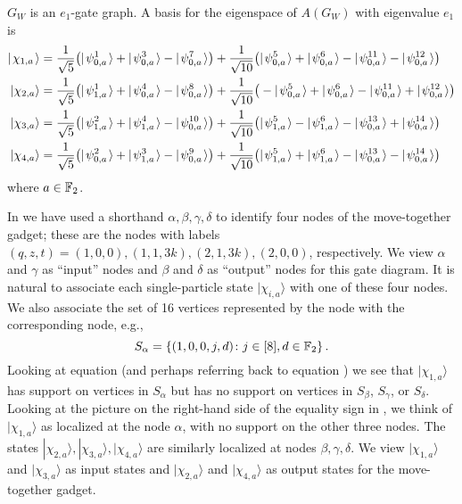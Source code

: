 \documentclass[../thesis-main/thesis-main]{subfiles}
\begin{document}
\begin{lemma}
$G_{W}$ is an $e_{1}$-gate graph. A basis for the eigenspace
of $A(G_{W})$ with eigenvalue $e_1$ is 
\begin{align}
  |\mspace{2mu} \chi_{1,a} \mspace{2mu} \rangle & =\frac{1}{\sqrt{5}}\big(|\mspace{2mu} \psi_{0,a}^{1} \mspace{2mu} \rangle + |\mspace{2mu} \psi_{0,a}^3 \mspace{2mu} \rangle - |\mspace{2mu} \psi_{0,a}^7 \mspace{2mu} \rangle\big) 
    +\frac{1}{\sqrt{10}}\big(|\mspace{2mu} \psi_{0,a}^{5} \mspace{2mu} \rangle + |\mspace{2mu} \psi_{0,a}^6 \mspace{2mu} \rangle - |\mspace{2mu} \psi_{0,a}^{11} \mspace{2mu} \rangle - |\mspace{2mu} \psi_{0,a}^{12} \mspace{2mu} \rangle\big)\label{eq:chi_alpha}\\
  |\chi_{2,a}\rangle & =\frac{1}{\sqrt{5}}\big(|\mspace{2mu} \psi_{1,a}^{1} \mspace{2mu} \rangle + |\mspace{2mu} \psi_{0,a}^4 \mspace{2mu} \rangle - |\mspace{2mu} \psi_{0,a}^8 \mspace{2mu} \rangle\big) 
    +\frac{1}{\sqrt{10}}\big(-|\mspace{2mu} \psi_{0,a}^{5} \mspace{2mu} \rangle + |\mspace{2mu} \psi_{0,a}^6 \mspace{2mu} \rangle - |\mspace{2mu} \psi_{0,a}^{11} \mspace{2mu} \rangle + |\mspace{2mu} \psi_{0,a}^{12} \mspace{2mu} \rangle\big)\label{eq:chi_beta}\\
  |\chi_{3,a}\rangle & =\frac{1}{\sqrt{5}}\big(|\mspace{2mu} \psi_{1,a}^{2} \mspace{2mu} \rangle + |\mspace{2mu} \psi_{1,a}^4 \mspace{2mu} \rangle - |\mspace{2mu} \psi_{0,a}^{10} \mspace{2mu} \rangle\big) 
    +\frac{1}{\sqrt{10}}\big(|\mspace{2mu} \psi_{1,a}^{5} \mspace{2mu} \rangle - |\mspace{2mu} \psi_{1,a}^6 \mspace{2mu} \rangle - |\mspace{2mu} \psi_{0,a}^{13} \mspace{2mu} \rangle + |\mspace{2mu} \psi_{0,a}^{14} \mspace{2mu} \rangle\big)\label{eq:chi_gamma}\\
|\chi_{4,a}\rangle & =\frac{1}{\sqrt{5}}\big(|\mspace{2mu} \psi_{0,a}^{2} \mspace{2mu} \rangle + |\mspace{2mu} \psi_{1,a}^3 \mspace{2mu} \rangle - |\mspace{2mu} \psi_{0,a}^{9} \mspace{2mu} \rangle\big) 
    +\frac{1}{\sqrt{10}}\big(|\mspace{2mu} \psi_{1,a}^{5} \mspace{2mu} \rangle + |\mspace{2mu} \psi_{1,a}^6 \mspace{2mu} \rangle - |\mspace{2mu} \psi_{0,a}^{13} \mspace{2mu} \rangle - |\mspace{2mu} \psi_{0,a}^{14} \mspace{2mu} \rangle\big)\label{eq:chi_delta}
\end{align}
where $a\in\mathbb{F}_2$. 
\end{lemma}

In  we have used a shorthand $\alpha,\beta,\gamma,\delta$ to identify four nodes of the move-together gadget; these are the nodes with labels $(q,z,t)=(1,0,0),(1,1,3k),(2,1,3k),(2,0,0)$, respectively. We view $\alpha$ and $\gamma$ as ``input'' nodes and $\beta$ and $\delta$ as ``output'' nodes for this gate diagram. It is natural to associate each single-particle state $|\chi_{i,a}\rangle$ with one of these four nodes.  We also associate the set of 16 vertices represented by the node with the corresponding node, e.g.,
\begin{equation}
  S_{\alpha}=\left\{ (1,0,0,j,d)\colon j\in[8], d\in \mathbb{F}_2\right\} .
\end{equation}
Looking at equation  (and perhaps referring back to equation ) we see that $|\chi_{1,a}\rangle$ has support on vertices in $S_{\alpha}$ but has no support on vertices in $S_{\beta}$, $S_{\gamma}$, or $S_{\delta}$. Looking at the picture on the right-hand side of the equality sign in , we think of $|\chi_{1,a}\rangle$ as localized at the node $\alpha$, with no support on the other three nodes. The states $|\chi_{2,a}\rangle,|\chi_{3,a}\rangle,|\chi_{4,a}\rangle$ are similarly localized at nodes $\beta,\gamma,\delta$. We view $|\chi_{1,a}\rangle$ and $|\chi_{3,a}\rangle$ as input states and $|\chi_{2,a}\rangle$ and $|\chi_{4,a}\rangle$ as output states for the move-together gadget.
\end{document}
